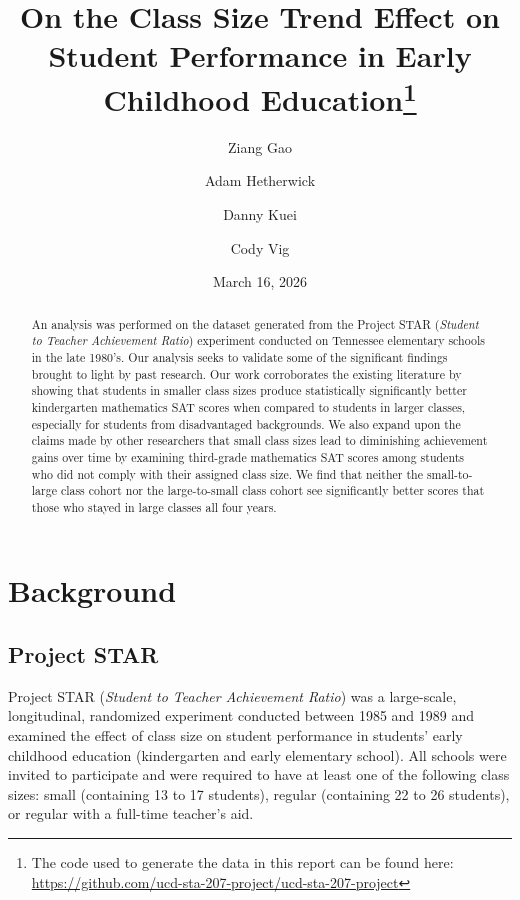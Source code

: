 \documentclass[11pt]{article}
\author[1]{Ziang Gao}
\author[1]{Adam Hetherwick}
\author[1]{Danny Kuei}
\author[1]{Cody Vig}
\affil[1]{%
    \centering
    \emph{Department of Statistics, University of California, Davis.}\protect\\
    \texttt{\{zggao, ajhetherwick, dkuei, cvig\}@ucdavis.edu}
}
\title{%
    On the Class Size Trend Effect on Student Performance in Early Childhood Education\footnote{The code used to generate the data in this report can be found here: \href{https://github.com/ucd-sta-207-project/ucd-sta-207-project}{https://github.com/ucd-sta-207-project/ucd-sta-207-project}}
}
\date{March 16, 2026}
\begin{document}
\maketitle

\begin{abstract}

An analysis was performed on the dataset generated from the Project STAR (\emph{Student to Teacher Achievement Ratio}) experiment conducted on Tennessee elementary schools in the late 1980's. Our analysis seeks to validate some of the significant findings brought to light by past research. Our work corroborates the existing literature by showing that students in smaller class sizes produce statistically significantly better kindergarten mathematics SAT scores when compared to students in larger classes, especially for students from disadvantaged backgrounds. We also expand upon the claims made by other researchers that small class sizes lead to diminishing achievement gains over time by examining third-grade mathematics SAT scores among students who did not comply with their assigned class size. We find that neither the small-to-large class cohort nor the large-to-small class cohort see significantly better scores that those who stayed in large classes all four years.

\end{abstract}


\section{Background}\par
\label{section:background}

\subsection{Project STAR}
Project STAR (\emph{Student to Teacher Achievement Ratio}) was a large-scale, longitudinal, randomized experiment conducted between 1985 and 1989 and examined the effect of class size on student performance in students' early childhood education (kindergarten and early elementary school). All schools were invited to participate and were required to have at least one of the following class sizes: small (containing 13 to 17 students), regular (containing 22 to 26 students), or regular with a full-time teacher's aid.
\end{document}
